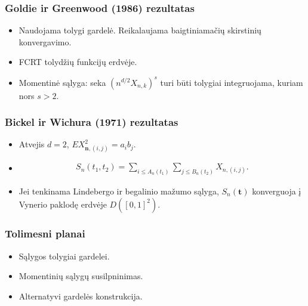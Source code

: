 \documentclass[utf8,hyperref={unicode}]{beamer}
\theoremstyle{change}\newtheorem{teorema}{Teiginys}
\theoremstyle{change}\newtheorem{salyga}{}
\newcommand{\n}{{\bm{n}}}
\begin{document}
\begin{frame}
    \frametitle{Goldie ir Greenwood (1986) rezultatas}
	\begin{itemize}
	    \item Naudojama tolygi gardelė. Reikalaujama baigtiniamačių
		skirstinių konvergavimo.
	    \item FCRT tolydžių funkcijų erdvėje.  
	    \item Momentinė sąlyga: seka $(n^{d/2}X_{n,k})^s$ turi būti tolygiai
		integruojama, kuriam nors $s>2$.
	\end{itemize}
\end{frame}
\begin{frame}
    \frametitle{Bickel ir Wichura (1971) rezultatas} 
    \begin{itemize}
	\item Atvejis $d=2$, $EX^2_{\n,(i,j)}=a_ib_j$.
	\item \begin{align*}
		S_n(t_1,t_2)=\sum_{i\le A_n(t_1)}\sum_{j\le
		B_n(t_2)}X_{n,(i,j)}.
	    \end{align*}
	\item Jei tenkinama Lindebergo ir begalinio mažumo sąlyga,
	    $S_n(\bm{t})$ konverguoja į Vynerio paklodę erdvėje $D([0,1]^2)$.		          \end{itemize}
\end{frame}
\begin{frame}
    \frametitle{Tolimesni planai} 
    \begin{itemize}
	\item Sąlygos tolygiai gardelei.
	\item Momentinių sąlygų susilpninimas.
	\item Alternatyvi gardelės konstrukcija.
    \end{itemize}
\end{frame}
\end{document}
